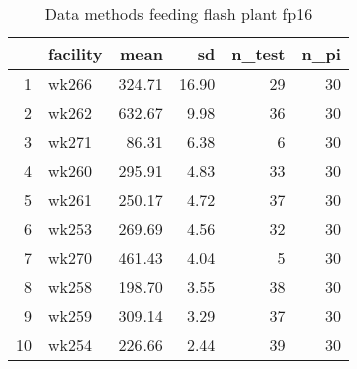 \begin{table}[H]
\centering
\begin{tabular}{rlrrrr}
  \hline
 & facility & mean & sd & n\_test & n\_pi \\ 
  \hline
1 & wk266 & 324.71 & 16.90 &  29 &  30 \\ 
  2 & wk262 & 632.67 & 9.98 &  36 &  30 \\ 
  3 & wk271 & 86.31 & 6.38 &   6 &  30 \\ 
  4 & wk260 & 295.91 & 4.83 &  33 &  30 \\ 
  5 & wk261 & 250.17 & 4.72 &  37 &  30 \\ 
  6 & wk253 & 269.69 & 4.56 &  32 &  30 \\ 
  7 & wk270 & 461.43 & 4.04 &   5 &  30 \\ 
  8 & wk258 & 198.70 & 3.55 &  38 &  30 \\ 
  9 & wk259 & 309.14 & 3.29 &  37 &  30 \\ 
  10 & wk254 & 226.66 & 2.44 &  39 &  30 \\ 
   \hline
\end{tabular}
\caption{Data methods feeding flash plant fp16} 
\label{tab:well_summaries_fp16}
\end{table}
